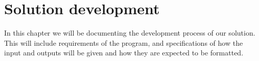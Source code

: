 \chapter{Solution development}
In this chapter we will be documenting the development process of our solution.
This will include requirements of the program, and specifications of how the input and outputs will be given and how they are expected to be formatted.

